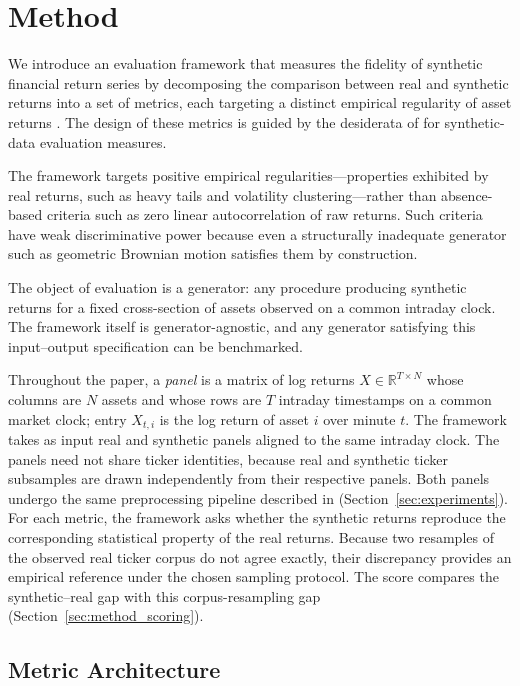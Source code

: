 \section{Method}\label{sec:method}

We introduce an evaluation framework that measures the fidelity of
synthetic financial return series by decomposing the comparison between
real and synthetic returns into a set of metrics, each targeting a
distinct empirical regularity of asset returns \citep{cont2001empirical}.
The design of these metrics is guided by the desiderata of
\citet{raisa2025position} for synthetic-data evaluation measures.

The framework targets positive empirical regularities---properties
exhibited by real returns, such as heavy tails and volatility
clustering---rather than absence-based criteria such as zero linear
autocorrelation of raw returns.
Such criteria have weak discriminative power because even a structurally
inadequate generator such as geometric Brownian motion satisfies them by
construction.

The object of evaluation is a generator: any procedure producing
synthetic returns for a fixed cross-section of assets observed on a
common intraday clock.
The framework itself is generator-agnostic, and any generator satisfying
this input--output specification can be benchmarked.

Throughout the paper, a \emph{panel} is a matrix of log returns
$X \in \mathbb{R}^{T \times N}$ whose columns are $N$ assets and whose
rows are $T$ intraday timestamps on a common market clock; entry
$X_{t,i}$ is the log return of asset $i$ over minute $t$.
The framework takes as input real and synthetic panels aligned to the same intraday clock.
The panels need not share ticker identities, because real and synthetic ticker subsamples are drawn independently from their respective panels.
Both panels undergo the same preprocessing pipeline described in (Section~\ref{sec:experiments}).
For each metric, the framework asks whether the synthetic returns
reproduce the corresponding statistical property of the real returns.
Because two resamples of the observed real ticker corpus do not agree
exactly, their discrepancy provides an empirical reference under the chosen
sampling protocol.
The score compares the synthetic--real gap with this corpus-resampling gap (Section~\ref{sec:method_scoring}).

\subsection{Metric Architecture}\label{sec:method_architecture}


